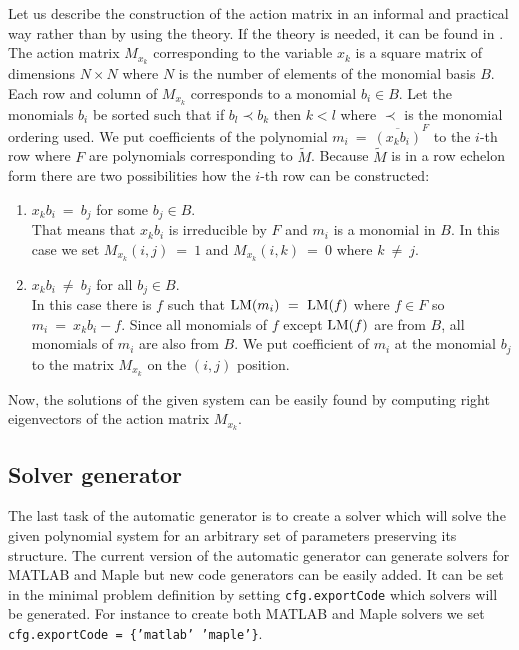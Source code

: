 Let us describe the construction of the action matrix in an informal and practical way rather than by using the theory. If the theory is needed, it can be found in \cite{KukelovaAlgMethods}. The action matrix $M_{x_k}$ corresponding to the variable $x_k$ is a square matrix of dimensions $N \times N$ where $N$ is the number of elements of the monomial basis $B$. Each row and column of $M_{x_k}$ corresponds to a monomial $b_i \in B$. Let the monomials $b_i$ be sorted such that if $b_l \prec b_k$ then $k < l$ where $\prec$ is the monomial ordering used. We put coefficients of the polynomial $m_i\ =\ \overline{(x_k b_i)}^F$ to the $i$-th row where $F$ are polynomials corresponding to $\tilde{M}$. Because $\tilde{M}$ is in a row echelon form there are two possibilities how the $i$-th row can be constructed:
\begin{enumerate}
  \item $x_k b_i\ =\ b_j$ for some $b_j \in B$.\\
	  That means that $x_k b_i$ is irreducible by $F$ and $m_i$ is a monomial in $B$. In this case we set $M_{x_k}(i, j)\ =\ 1$ and $M_{x_k}(i, k)\ =\ 0$ where $k\ \neq\ j$.
  \item $x_k b_i\ \neq\ b_j$ for all $b_j \in B$.\\
	  In this case there is $f$ such that $\operatorname{LM}(m_i)\ =\ \operatorname{LM}(f)$ where $f \in F$ so $m_i\ =\ x_k b_i - f$. Since all monomials of $f$ except $\operatorname{LM}(f)$ are from $B$, all monomials of $m_i$ are also from $B$. We put coefficient of $m_i$ at the monomial $b_j$ to the matrix $M_{x_k}$ on the $(i, j)$ position.
\end{enumerate}

Now, the solutions of the given system can be easily found by computing right eigenvectors of the action matrix $M_{x_k}$.

\subsection{Solver generator}
The last task of the automatic generator is to create a solver which will solve the given polynomial system for an arbitrary set of parameters preserving its structure. The current version of the automatic generator can generate solvers for MATLAB and Maple but new code generators can be easily added. It can be set in the minimal problem definition by setting \texttt{cfg.exportCode} which solvers will be generated. For instance to create both MATLAB and Maple solvers we set \texttt{cfg.exportCode = \{'matlab' 'maple'\}}.

